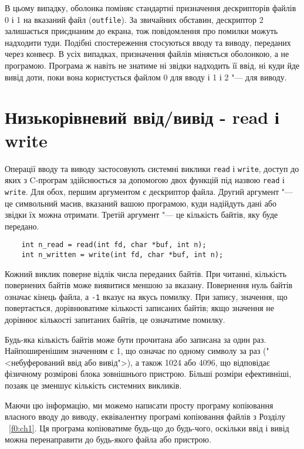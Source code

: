 \documentclass[a4paper,12pt]{book}
\begin{document}
  В цьому випадку, оболонка поміняє стандартні призначення дескрипторів файлів 0 і 1 на
  вказаний файл (\texttt{outfile}). За звичайних обставин, дескриптор 2 залишається
  приєднаним до екрана, тож повідомлення про помилки можуть надходити туди. Подібні
  спостереження стосуються вводу та виводу, переданих через конвеєр. В усіх випадках,
  призначення файлів міняється оболонкою, а не програмою. Програма ж навіть не знатиме ні
  звідки надходить її ввід, ні куди йде вивід доти, поки вона користується файлом 0 для
  вводу і 1 і 2 "--- для виводу.

\section{Низькорівневий ввід/вивід - read і write}


  Операції вводу та виводу застосовують системні виклики \texttt{read} і \texttt{write},
  доступ до яких з C-програм здійснюється за допомогою двох функцій під назвою
  \texttt{read} і \texttt{write}. Для обох, першим аргументом є дескриптор файла. Другий
  аргумент "--- це символьний масив, вказаний вашою програмою, куди надійдуть дані або
  звідки їх можна отримати. Третій аргумент "--- це кількість байтів, яку буде передано.
  \begin{verbatim}
    int n_read = read(int fd, char *buf, int n);
    int n_written = write(int fd, char *buf, int n);
  \end{verbatim}

  Кожний виклик поверне відлік числа переданих байтів. При читанні, кількість повернених
  байтів може виявитися меншою за вказану. Повернення нуль байтів означає кінець файла, а
  \texttt{-1} вказує на якусь помилку. При запису, значення, що повертається,
  дорівнюватиме кількості записаних байтів; якщо значення не дорівнює кількості запитаних
  байтів, це означатиме помилку.

  Будь-яка кількість байтів може бути прочитана або записана за один раз. Найпоширенішим
  значенням є 1, що означає по одному символу за раз ("<небуферований ввід або
  вивід">), а також 1024 або 4096, що відповідає фізичному розмірові блока
  зовнішнього пристрою. Більші розміри ефективніші, позаяк це зменшує кількість системних
  викликів.

  Маючи цю інформацію, ми можемо написати просту програму копіювання власного вводу до
  виводу, еквівалентну програмі копіювання файлів з Розділу ~\ref{f0:ch1}. Ця
  програма копіюватиме будь-що до будь-чого, оскільки ввід і вивід можна перенаправити до
  будь-якого файла або пристрою.
\end{document}
